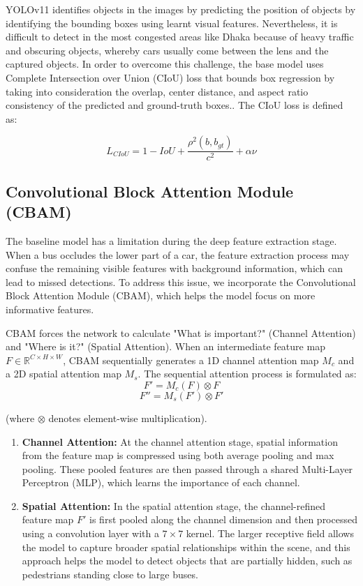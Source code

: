 \documentclass[sigconf]{acmart}
\begin{document}
YOLOv11 identifies objects in the images by predicting the position of objects by identifying the bounding boxes using learnt visual features. Nevertheless, it is difficult to detect in the most congested areas like Dhaka because of heavy traffic and obscuring objects, whereby cars usually come between the lens and the captured objects. In order to overcome this challenge, the base model uses Complete Intersection over Union (CIoU) loss that bounds box regression by taking into consideration the overlap, center distance, and aspect ratio consistency of the predicted and ground-truth boxes.. The CIoU loss is defined as:

\begin{equation}
L_{CIoU} = 1 - IoU + \frac{\rho^2(b, b_{gt})}{c^2} + \alpha \nu
\end{equation}


\subsection{Convolutional Block Attention Module (CBAM)}
The baseline model has a limitation during the deep feature extraction stage. When a bus occludes the lower part of a car, the feature extraction process may confuse the remaining visible features with background information, which can lead to missed detections. To address this issue, we incorporate the Convolutional Block Attention Module (CBAM)\cite{Woo2018CBAM}, which helps the model focus on more informative features.

CBAM forces the network to calculate "What is important?" (Channel Attention) and "Where is it?" (Spatial Attention). When an intermediate feature map $F \in \mathbb{R}^{C \times H \times W}$, CBAM sequentially generates a 1D channel attention map $M_{c}$ and a 2D spatial attention map $M_{s}$. The sequential attention process is formulated as:
\[
F' = M_{c}(F) \otimes F
\]
\[
F'' = M_{s}(F') \otimes F'
\]


(where $\otimes$ denotes element-wise multiplication).

\begin{enumerate}
    \item \textbf{Channel Attention:} At the channel attention stage, spatial information from the feature map is compressed using both average pooling and max pooling. These pooled features are then passed through a shared Multi-Layer Perceptron (MLP), which learns the importance of each channel.
    
    \item \textbf{Spatial Attention:} In the spatial attention stage, the channel-refined feature map $F'$ is first pooled along the channel dimension and then processed using a convolution layer with a $7 \times 7$ kernel. The larger receptive field allows the model to capture broader spatial relationships within the scene, and this approach helps the model to detect objects that are partially hidden, such as pedestrians standing close to large buses.

\end{enumerate}
\end{document}
